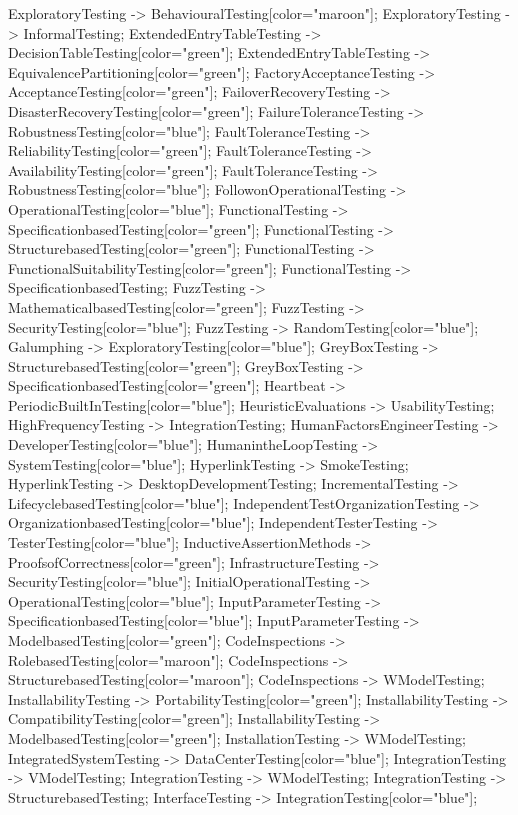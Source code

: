 \documentclass{article}
\begin{document}
{ExploratoryTesting -> BehaviouralTesting[color="maroon"];
ExploratoryTesting -> InformalTesting;
ExtendedEntryTableTesting -> DecisionTableTesting[color="green"];
ExtendedEntryTableTesting -> EquivalencePartitioning[color="green"];
FactoryAcceptanceTesting -> AcceptanceTesting[color="green"];
FailoverRecoveryTesting -> DisasterRecoveryTesting[color="green"];
FailureToleranceTesting -> RobustnessTesting[color="blue"];
FaultToleranceTesting -> ReliabilityTesting[color="green"];
FaultToleranceTesting -> AvailabilityTesting[color="green"];
FaultToleranceTesting -> RobustnessTesting[color="blue"];
FollowonOperationalTesting -> OperationalTesting[color="blue"];
FunctionalTesting -> SpecificationbasedTesting[color="green"];
FunctionalTesting -> StructurebasedTesting[color="green"];
FunctionalTesting -> FunctionalSuitabilityTesting[color="green"];
FunctionalTesting -> SpecificationbasedTesting;
FuzzTesting -> MathematicalbasedTesting[color="green"];
FuzzTesting -> SecurityTesting[color="blue"];
FuzzTesting -> RandomTesting[color="blue"];
Galumphing -> ExploratoryTesting[color="blue"];
GreyBoxTesting -> StructurebasedTesting[color="green"];
GreyBoxTesting -> SpecificationbasedTesting[color="green"];
Heartbeat -> PeriodicBuiltInTesting[color="blue"];
HeuristicEvaluations -> UsabilityTesting;
HighFrequencyTesting -> IntegrationTesting;
HumanFactorsEngineerTesting -> DeveloperTesting[color="blue"];
HumanintheLoopTesting -> SystemTesting[color="blue"];
HyperlinkTesting -> SmokeTesting;
HyperlinkTesting -> DesktopDevelopmentTesting;
IncrementalTesting -> LifecyclebasedTesting[color="blue"];
IndependentTestOrganizationTesting -> OrganizationbasedTesting[color="blue"];
IndependentTesterTesting -> TesterTesting[color="blue"];
InductiveAssertionMethods -> ProofsofCorrectness[color="green"];
InfrastructureTesting -> SecurityTesting[color="blue"];
InitialOperationalTesting -> OperationalTesting[color="blue"];
InputParameterTesting -> SpecificationbasedTesting[color="blue"];
InputParameterTesting -> ModelbasedTesting[color="green"];
CodeInspections -> RolebasedTesting[color="maroon"];
CodeInspections -> StructurebasedTesting[color="maroon"];
CodeInspections -> WModelTesting;
InstallabilityTesting -> PortabilityTesting[color="green"];
InstallabilityTesting -> CompatibilityTesting[color="green"];
InstallabilityTesting -> ModelbasedTesting[color="green"];
InstallationTesting -> WModelTesting;
IntegratedSystemTesting -> DataCenterTesting[color="blue"];
IntegrationTesting -> VModelTesting;
IntegrationTesting -> WModelTesting;
IntegrationTesting -> StructurebasedTesting;
InterfaceTesting -> IntegrationTesting[color="blue"];
}
\end{document}
